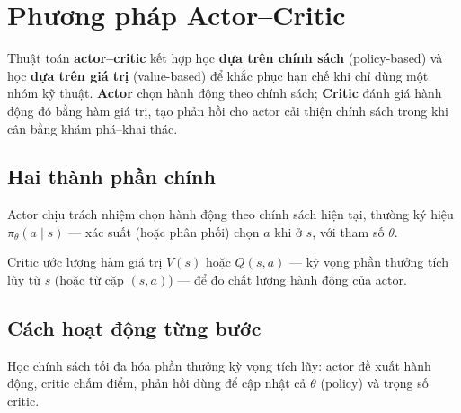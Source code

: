 \section{Phương pháp Actor--Critic}
\label{sec:actor-critic}

\begin{dinhnghia}[title={Actor--Critic}]
Thuật toán \textbf{actor--critic} kết hợp học \textbf{dựa trên chính sách} (policy-based) và học \textbf{dựa trên giá trị} (value-based) để khắc phục hạn chế khi chỉ dùng một nhóm kỹ thuật. \textbf{Actor} chọn hành động theo chính sách; \textbf{Critic} đánh giá hành động đó bằng hàm giá trị, tạo phản hồi cho actor cải thiện chính sách trong khi cân bằng khám phá--khai thác.
\end{dinhnghia}

\subsection{Hai thành phần chính}

\begin{dinhnghia}[title={Actor}]
Actor chịu trách nhiệm chọn hành động theo chính sách hiện tại, thường ký hiệu $\pi_\theta(a \mid s)$ --- xác suất (hoặc phân phối) chọn $a$ khi ở $s$, với tham số $\theta$.
\end{dinhnghia}

\begin{dinhnghia}[title={Critic}]
Critic ước lượng hàm giá trị $V(s)$ hoặc $Q(s,a)$ --- kỳ vọng phần thưởng tích lũy từ $s$ (hoặc từ cặp $(s,a)$) --- để đo chất lượng hành động của actor.
\end{dinhnghia}

\subsection{Cách hoạt động từng bước}

\begin{phuongphap}[title={target}]
Học chính sách tối đa hóa phần thưởng kỳ vọng tích lũy: actor đề xuất hành động, critic chấm điểm, phản hồi dùng để cập nhật cả $\theta$ (policy) và trọng số critic.
\end{phuongphap}

